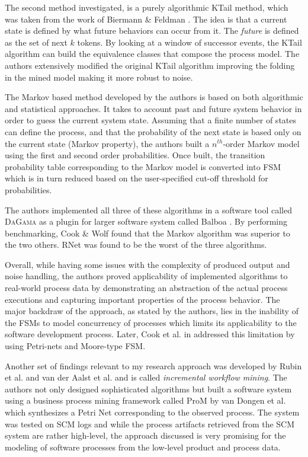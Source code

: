 \documentclass{sig-alternate}
\begin{document}
The second method investigated, is a purely algorithmic KTail method, which was taken from the work of Biermann \& Feldman \cite{citeulike:5120603}. The idea is that a current state is defined by what future behaviors can occur from it. The \textit{future} is defined as the set of next $k$ tokens. By looking at a window of successor events, the KTail algorithm can build the equivalence classes that compose the process model. The authors extensively modified the original KTail algorithm improving the folding in the mined model making it more robust to noise.

The Markov based method developed by the authors is based on both algorithmic and statistical approaches. It takes to account past and future system behavior in order to guess the current system state. Assuming that a finite number of states can define the process, and that the probability of the next state is based only on the current state (Markov property), the authors built a $n^{th}$-order Markov model using the first and second order probabilities. Once built, the transition probability table corresponding to the Markov model is converted into FSM which is in turn reduced based on the user-specified cut-off threshold for probabilities.

The authors implemented all three of these algorithms in a software tool called \textsc{DaGama} as a plugin for larger software system called Balboa \cite{citeulike:5120757}. By performing benchmarking, Cook \& Wolf found that the Markov algorithm was superior to the two others. RNet was found to be the worst of the three algorithms. 

Overall, while having some issues with the complexity of produced output and noise handling, the authors proved applicability of implemented algorithms to real-world process data by demonstrating an abstraction of the actual process executions and capturing important properties of the process behavior. The major backdraw of the approach, as stated by the authors, lies in the inability of the FSMs to model concurrency of processes which limits its applicability to the software development process. Later, Cook et al. in \cite{citeulike:5128143} addressed this limitation by using Petri-nets and Moore-type FSM.

Another set of findings relevant to my research approach was developed by Rubin et al. \cite{citeulike:1885717} and van der Aalst et al. \cite{citeulike:3718014} and is called \textit{incremental workflow mining}. The authors not only designed sophisticated algorithms but built a software system using a business process mining framework called ProM by van Dongen et al. \cite{citeulike:5043673} which synthesizes a Petri Net corresponding to the observed process. The system was tested on SCM logs and while the process artifacts retrieved from the SCM system are rather high-level, the approach discussed is very promising for the modeling of software processes from the low-level product and process data.
\end{document}
